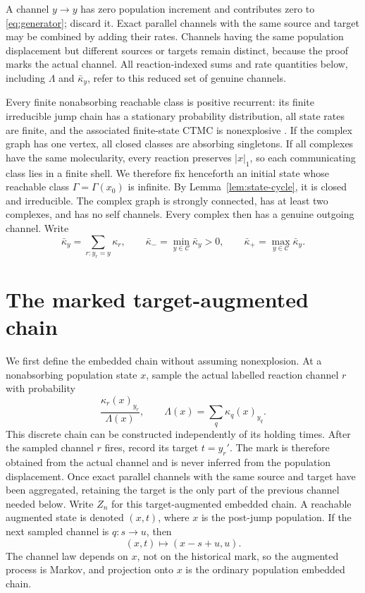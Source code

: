 A channel \(y\to y\) has zero population increment and contributes zero to
\eqref{eq:generator}; discard it.  Exact parallel channels with the same
source and target may be combined by adding their rates.  Channels having the
same population displacement but different sources or targets remain
distinct, because the proof marks the actual channel.
All reaction-indexed sums and rate quantities below, including \(\Lambda\)
and \(\bar\kappa_y\), refer to this reduced set of genuine channels.

Every finite nonabsorbing reachable class is positive recurrent:
its finite irreducible jump chain has a stationary probability distribution,
all state rates are finite, and the associated finite-state CTMC is
nonexplosive \citep{Norris1997}.  If
the complex graph has one vertex, all closed classes are absorbing
singletons.  If all complexes have the same molecularity, every reaction
preserves \(|x|_1\), so each communicating class lies in a finite shell.  We
therefore fix henceforth an initial state whose reachable class
\(\Gamma=\Gamma(x_0)\) is infinite.  By
Lemma~\ref{lem:state-cycle}, it is closed and irreducible.  The complex graph
is strongly connected, has at least two complexes, and has no self channels.
Every complex then has a genuine outgoing channel.  Write
\begin{equation}\label{eq:kbar}
  \bar\kappa_y=\sum_{r:y_r=y}\kappa_r,
  \qquad
  \bar\kappa_- =\min_{y\in\mathcal C}\bar\kappa_y>0,
  \qquad
  \bar\kappa_+ =\max_{y\in\mathcal C}\bar\kappa_y.
\end{equation}

\section{The marked target-augmented chain}\label{sec:marked}

We first define the embedded chain without assuming nonexplosion.  At a
nonabsorbing population state \(x\), sample the actual labelled reaction
channel \(r\) with probability
\begin{equation}\label{eq:channel-kernel}
  \frac{\kappa_r(x)_{y_r}}{\Lambda(x)},
  \qquad
  \Lambda(x)=\sum_q\kappa_q(x)_{y_q}.
\end{equation}
This discrete chain can be constructed independently of its holding times.
After the sampled channel \(r\) fires, record its target \(t=y_r'\).  The mark
is therefore obtained from the actual channel and is never inferred from the
population displacement.  Once exact parallel channels with the same source
and target have been aggregated, retaining the target is the only part of the
previous channel needed below.  Write \(Z_n\) for this target-augmented
embedded chain.  A reachable augmented state is denoted \((x,t)\), where
\(x\) is the post-jump population.  If the next sampled
channel is \(q:s\to u\), then
\begin{equation}\label{eq:aug-transition}
  (x,t)\longmapsto(x-s+u,u).
\end{equation}
The channel law depends on \(x\), not on the historical mark, so the augmented
process is Markov, and projection onto \(x\) is the ordinary population
embedded chain.

